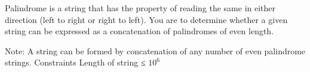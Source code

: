 Palindrome is a string that has the property of reading the same in either direction (left to right or right to left). You are to determine whether a given string can be expressed as a concatenation of palindromes of even length.  

   Note: A string can be formed by concatenation of any number of even palindrome strings.
   Constraints  
Length of string ≤ $10^{6}$